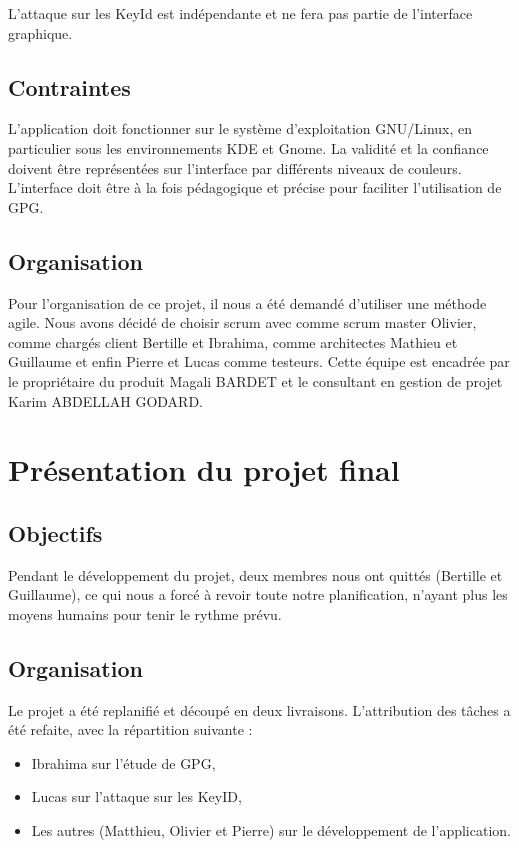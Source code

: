 \documentclass{../res/univ-projet}
\begin{document}
  L'attaque sur les KeyId est indépendante et ne fera pas partie de l'interface graphique. 
  
  \subsection{Contraintes}
  
  L'application doit fonctionner sur le système d'exploitation GNU/Linux, en particulier sous les environnements KDE et Gnome. La validité et la confiance doivent être représentées sur l'interface par différents niveaux de couleurs.
  L'interface doit être à la fois pédagogique et précise pour faciliter l'utilisation de GPG.
  
  
  \subsection{Organisation}
  
  Pour l'organisation de ce projet, il nous a été demandé d'utiliser une méthode agile. Nous avons décidé de choisir scrum avec comme scrum master Olivier, comme chargés client Bertille et Ibrahima, comme architectes Mathieu et Guillaume et enfin Pierre et Lucas comme testeurs. Cette équipe est encadrée par le propriétaire du produit Magali BARDET et le consultant en gestion de projet 	Karim ABDELLAH GODARD.
  
  \newpage

\section{Présentation du projet final}
  \subsection{Objectifs}
    Pendant le développement du projet, deux membres nous ont quittés (Bertille et Guillaume), ce qui nous a forcé à revoir toute notre planification, n'ayant plus les moyens humains pour tenir le rythme prévu.
  \subsection{Organisation}
    
    Le projet a été replanifié et découpé en deux livraisons.
    L'attribution des tâches a été refaite, avec la répartition suivante :
    \begin{itemize}
      \item Ibrahima sur l'étude de GPG,
      \item Lucas sur l'attaque sur les KeyID,
      \item Les autres (Matthieu, Olivier et Pierre) sur le développement de l'application.
    \end{itemize}
\end{document}
